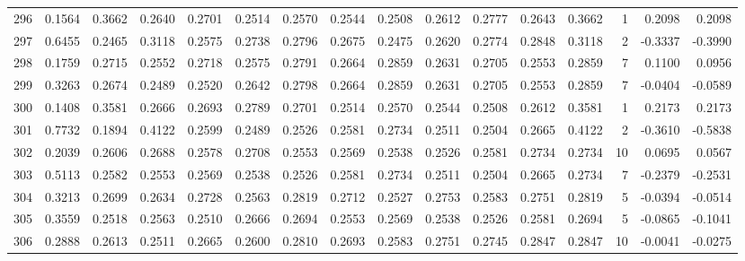 \begin{tabular}{lrrrrrrrrrrrrrrr}
296 &      0.1564 &  0.3662 &  0.2640 &  0.2701 &  0.2514 &  0.2570 &  0.2544 &  0.2508 &  0.2612 &  0.2777 &   0.2643 &     0.3662 &      1 &                    0.2098 &                     0.2098 \\
297 &      0.6455 &  0.2465 &  0.3118 &  0.2575 &  0.2738 &  0.2796 &  0.2675 &  0.2475 &  0.2620 &  0.2774 &   0.2848 &     0.3118 &      2 &                   -0.3337 &                    -0.3990 \\
298 &      0.1759 &  0.2715 &  0.2552 &  0.2718 &  0.2575 &  0.2791 &  0.2664 &  0.2859 &  0.2631 &  0.2705 &   0.2553 &     0.2859 &      7 &                    0.1100 &                     0.0956 \\
299 &      0.3263 &  0.2674 &  0.2489 &  0.2520 &  0.2642 &  0.2798 &  0.2664 &  0.2859 &  0.2631 &  0.2705 &   0.2553 &     0.2859 &      7 &                   -0.0404 &                    -0.0589 \\
300 &      0.1408 &  0.3581 &  0.2666 &  0.2693 &  0.2789 &  0.2701 &  0.2514 &  0.2570 &  0.2544 &  0.2508 &   0.2612 &     0.3581 &      1 &                    0.2173 &                     0.2173 \\
301 &      0.7732 &  0.1894 &  0.4122 &  0.2599 &  0.2489 &  0.2526 &  0.2581 &  0.2734 &  0.2511 &  0.2504 &   0.2665 &     0.4122 &      2 &                   -0.3610 &                    -0.5838 \\
302 &      0.2039 &  0.2606 &  0.2688 &  0.2578 &  0.2708 &  0.2553 &  0.2569 &  0.2538 &  0.2526 &  0.2581 &   0.2734 &     0.2734 &     10 &                    0.0695 &                     0.0567 \\
303 &      0.5113 &  0.2582 &  0.2553 &  0.2569 &  0.2538 &  0.2526 &  0.2581 &  0.2734 &  0.2511 &  0.2504 &   0.2665 &     0.2734 &      7 &                   -0.2379 &                    -0.2531 \\
304 &      0.3213 &  0.2699 &  0.2634 &  0.2728 &  0.2563 &  0.2819 &  0.2712 &  0.2527 &  0.2753 &  0.2583 &   0.2751 &     0.2819 &      5 &                   -0.0394 &                    -0.0514 \\
305 &      0.3559 &  0.2518 &  0.2563 &  0.2510 &  0.2666 &  0.2694 &  0.2553 &  0.2569 &  0.2538 &  0.2526 &   0.2581 &     0.2694 &      5 &                   -0.0865 &                    -0.1041 \\
306 &      0.2888 &  0.2613 &  0.2511 &  0.2665 &  0.2600 &  0.2810 &  0.2693 &  0.2583 &  0.2751 &  0.2745 &   0.2847 &     0.2847 &     10 &                   -0.0041 &                    -0.0275 \\

\end{tabular}
